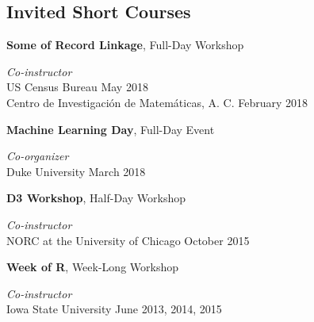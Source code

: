 \documentclass[margin,line]{res}
\begin{document}
\begin{resume}
\section{\sc Invited Short Courses}

{\bf Some of Record Linkage},  Full-Day Workshop

\vspace{-.4cm}
{\em Co-instructor} \hfill \\

\vspace{-.7cm}
US Census Bureau \hfill May 2018 \\

\vspace{-.7cm}
Centro de Investigaci\'{o}n de Matem\'{a}ticas, A. C. \hfill February 2018



{\bf Machine Learning Day}, Full-Day Event

\vspace{-.4cm}
{\em Co-organizer} \hfill \\

\vspace{-.7cm}
Duke University \hfill March 2018


{\bf D3 Workshop}, Half-Day Workshop

\vspace{-.4cm}
{\em Co-instructor} \hfill \\

\vspace{-.7cm}
NORC at the University of Chicago \hfill October 2015


{\bf Week of R}, Week-Long Workshop

\vspace{-.4cm}
{\em Co-instructor} \hfill \\

\vspace{-.7cm}
Iowa State University \hfill June 2013, 2014, 2015


\end{resume}
\end{document}
